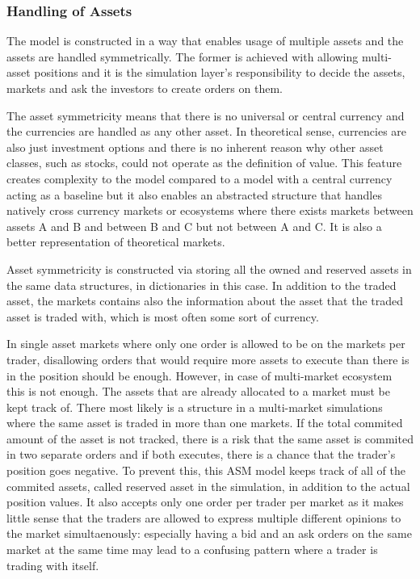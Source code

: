 \subsubsection{Handling of Assets}

The model is constructed in a way that enables usage of multiple assets
and the assets are handled symmetrically. The former is achieved with
allowing multi-asset positions and it is the simulation layer's 
responsibility to decide the assets, markets and ask the investors
to create orders on them.

The asset symmetricity means that there is no universal or central currency 
and the currencies are handled as any other asset. In theoretical sense, 
currencies are also just investment options and there is no inherent reason why other 
asset classes, such as stocks, could not operate as the definition 
of value. This feature creates complexity to the model compared to a model
with a central currency acting as a baseline but it also enables an
abstracted structure that handles natively cross currency
markets or ecosystems where there exists markets between assets A and 
B and between B and C but not between A and C. It is also a better 
representation of theoretical markets.

Asset symmetricity is constructed via storing all the owned and reserved
assets in the same data structures, in dictionaries in this case. In addition
to the traded asset, the markets contains also the information about the asset
that the traded asset is traded with, which is most often some sort of currency. 

In single asset markets where only one order is allowed to be on the markets
per trader, disallowing orders that would require more assets to execute
than there is in the position should be enough. However, in case of multi-market
ecosystem this is not enough. The assets that are already allocated to 
a market must be kept track of. There most likely is a structure in a multi-market
simulations where the same asset is traded in more than one markets. If the
total commited amount of the asset is not tracked, there is a risk that the
same asset is commited in two separate orders and if both executes,
there is a chance that the trader's position goes negative. To prevent this,
this ASM model keeps track of all of the commited assets, called reserved
asset in the simulation, in addition to the actual position values. It also
accepts only one order per trader per market as it makes little sense that
the traders are allowed to express multiple different opinions to the market 
simultaenously: especially having a bid and an ask orders on the same market
at the same time may lead to a confusing pattern where a trader is trading with
itself. 

